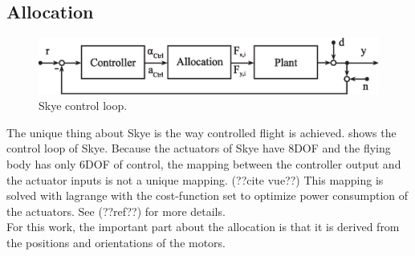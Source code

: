 \subsection{Allocation}

\begin{figure}[hbtp]
\centering
\includegraphics[width=.9\linewidth]{images/system_loop_3.eps}
\caption{Skye control loop.}
\label{fig:system_loop_3}
\end{figure}

The unique thing about Skye is the way controlled flight is achieved. 
 shows the control loop of Skye.
Because the actuators of Skye have 8DOF and the flying body has only 6DOF of control, the mapping between the controller output and the actuator inputs is not a unique mapping. (??cite vue??)
This mapping is solved with lagrange with the cost-function set to optimize power consumption of the actuators. See (??ref??) for more details.\\
For this work, the important part about the allocation is that it is derived from the positions and orientations of the motors.

